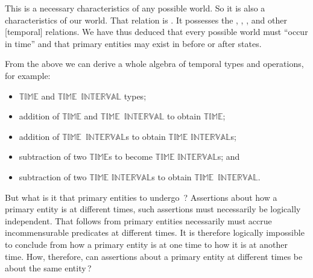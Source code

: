 \mnewfoil

\begynd
\pind This is a necessary characteristics of any possible world.
\pind So it is also a characteristics of our world.
\pind That relation is .
\begynd
\pind It possesses the , , ,
      and other [temporal] relations.
%
%
%
%
%
%
\afslut
\pind We have thus deduced that every possible world \nyl
      must ``occur in time'' \nyl
      and that primary entities may exist in\ysfchg{, } before or after states.
\afslut

\mnewfoil

\begynd
\pind From the above we can derive a whole algebra of temporal types
      and operations, for example:
\afslut
\begin{itemize}
\item $\mathbb{TIME}$ and $\mathbb{TIME}$\ $\mathbb{INTERVAL}$ types;
\item addition of $\mathbb{TIME}$ and $\mathbb{TIME}$\ $\mathbb{INTERVAL}$ to obtain $\mathbb{TIME}$;
%
\item addition of $\mathbb{TIME}$\ $\mathbb{INTERVAL}$s to obtain $\mathbb{TIME}$ $\mathbb{INTERVAL}$s;
%
\item subtraction of two $\mathbb{TIME}$s to become $\mathbb{TIME}$
  $\mathbb{INTERVAL}$s; and
%
\item subtraction of two $\mathbb{TIME}$ $\mathbb{INTERVAL}$s to obtain $\mathbb{TIME}$\ $\mathbb{INTERVAL}$.
%
\end{itemize}


\begynd
\pind But what is it that  primary entities to undergo
      \,? %
\begynd
\pind Assertions about how a primary entity is at different times, \nyl
      such assertions must necessarily be logically independent.
\pind That follows from primary entities necessarily must accrue
      incommensurable predicates at different times.
\pind It is therefore logically impossible to conclude from how a
      primary entity is at one time to  how it is at another time.
\pind How, therefore, can assertions about a primary entity at
      different times be about the same entity\,?
\afslut
\afslut

